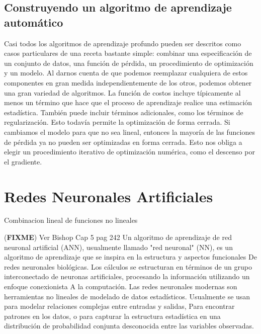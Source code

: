 \documentclass[a4paper,11pt,spanish]{book}
\newcommand*{\FIXME}[1]{{(\textbf{FIXME}) {#1}}}
\begin{document}
    \subsection{Construyendo un algoritmo de aprendizaje automático}
      Casi todos los algoritmos de aprendizaje profundo pueden ser descritos como casos particulares de una receta bastante simple: 
      combinar una especificación de un conjunto de datos, una función de pérdida, un procedimiento de optimización y un modelo.
      Al darnos cuenta de que podemos reemplazar cualquiera de estos componentes en gran medida independientemente de los otros, podemos obtener una gran variedad de algoritmos.
      La función de costos incluye típicamente al menos un término que hace que el proceso de aprendizaje realice una estimación estadística. También puede incluir términos adicionales, 
      como los términos de regularización. Esto todavía permite la optimización de forma cerrada. 
      Si cambiamos el modelo para que no sea lineal, entonces la mayoría de las funciones de pérdida ya no pueden ser optimizadas en forma cerrada. 
      Esto nos obliga a elegir un procedimiento iterativo de optimización numérica, como el descenso por el gradiente.
    
    \section{Redes Neuronales Artificiales}
      Combinacion lineal de funciones no lineales
 \iffalse
      An artificial neural network (ANN) learning algorithm, usually called "neural network" (NN), is a learning algorithm that is inspired by the structure and functional aspects 
      of biological neural networks. Computations are structured in terms of an interconnected group of artificial neurons, processing information using a connectionist approach 
      to computation. Modern neural networks are non-linear statistical data modeling tools. They are usually used to model complex relationships between inputs and outputs, 
      to find patterns in data, or to capture the statistical structure in an unknown joint probability distribution between observed variables.
      
 \fi
 \FIXME{Ver Bishop Cap 5 pag 242}
      Un algoritmo de aprendizaje de red neuronal artificial (ANN), usualmente llamado "red neuronal" (NN), es un algoritmo de aprendizaje que se inspira en la estructura y aspectos funcionales
      De redes neuronales biológicas. Los cálculos se estructuran en términos de un grupo interconectado de neuronas artificiales, procesando la información utilizando un enfoque conexionista
      A la computación. Las redes neuronales modernas son herramientas no lineales de modelado de datos estadísticos. Usualmente se usan para modelar relaciones complejas entre entradas y salidas,
      Para encontrar patrones en los datos, o para capturar la estructura estadística en una distribución de probabilidad conjunta desconocida entre las variables observadas.
      
\end{document}
